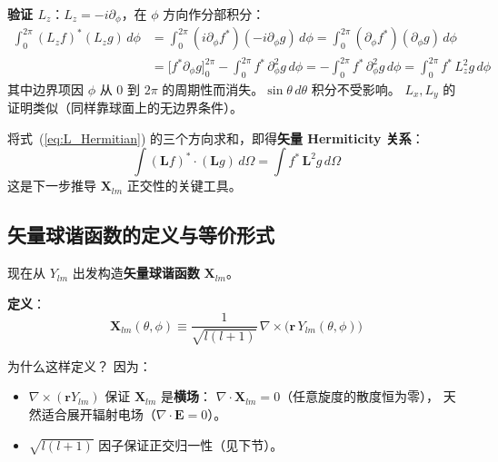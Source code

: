 \textbf{验证 $L_z$}：$L_z = -i\partial_\phi$，在 $\phi$ 方向作分部积分：
\begin{align*}
\int_0^{2\pi} (L_z f)^* (L_z g)\,d\phi
&= \int_0^{2\pi} (i\partial_\phi f^*) (-i\partial_\phi g)\,d\phi
= \int_0^{2\pi} (\partial_\phi f^*)(\partial_\phi g)\,d\phi \\
&= \bigl[f^*\partial_\phi g\bigr]_0^{2\pi}
   - \int_0^{2\pi} f^*\,\partial_\phi^2 g\,d\phi
= -\int_0^{2\pi} f^*\,\partial_\phi^2 g\,d\phi
= \int_0^{2\pi} f^*\,L_z^2 g\,d\phi
\end{align*}
其中边界项因 $\phi$ 从 $0$ 到 $2\pi$ 的周期性而消失。$\sin\theta\,d\theta$ 积分不受影响。
$L_x,L_y$ 的证明类似（同样靠球面上的无边界条件）。

将式~(\ref{eq:L_Hermitian}) 的三个方向求和，即得\textbf{矢量 Hermiticity 关系}：
\begin{equation}
\int (\mathbf{L}f)^* \cdot (\mathbf{L}g)\,d\Omega = \int f^*\,\mathbf{L}^2 g\,d\Omega
\label{eq:vec_L_Hermitian}
\end{equation}
这是下一步推导 $\mathbf{X}_{lm}$ 正交性的关键工具。

\subsection{矢量球谐函数的定义与等价形式}

现在从 $Y_{lm}$ 出发构造\textbf{矢量球谐函数} $\mathbf{X}_{lm}$。

\textbf{定义}：
\begin{equation}
  \boxed{\;
    \mathbf{X}_{lm}(\theta,\phi) \equiv \frac{1}{\sqrt{l(l+1)}}\,
    \nabla\times\bigl(\mathbf{r}\,Y_{lm}(\theta,\phi)\bigr)
    \;}
  \label{eq:Xlm_def}
\end{equation}

\begin{stepbox}{为什么这样定义？}
因为：
\begin{itemize}
  \item $\nabla\times(\mathbf{r}Y_{lm})$ 保证 $\mathbf{X}_{lm}$ 是\textbf{横场}：
    $\nabla\cdot\mathbf{X}_{lm}=0$（任意旋度的散度恒为零），
    天然适合展开辐射电场（$\nabla\cdot\mathbf{E}=0$）。
  \item $\sqrt{l(l+1)}$ 因子保证正交归一性（见下节）。
\end{itemize}
\end{stepbox}


